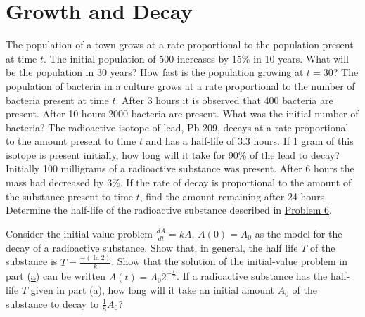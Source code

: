 \documentclass[chapter=3,section=1]{math252homework}
\begin{document}
\section{Growth and Decay}\label{sec:growth-and-decay}
\begin{problems}[start=3]
	\problem The population of a town grows at a rate proportional to the population present at time $t$. The initial population of 500 increases by 15\% in 10 years. What will be the population in 30 years? How fast is the population growing at $t=30$?
	\problem The population of bacteria in a culture grows at a rate proportional to the number of bacteria present at time $t$. After 3 hours it is observed that 400 bacteria are present. After 10 hours 2000 bacteria are present. What was the initial number of bacteria?
	\problem The radioactive isotope of lead, Pb-209, decays at a rate proportional to the amount present to time $t$ and has a half-life of 3.3 hours. If 1 gram of this isotope is present initially, how long will it take for 90\% of the lead to decay?
	\problem Initially 100 milligrams of a radioactive substance was present. After 6 hours the mass had decreased by 3\%. If the rate of decay is proportional to the amount of the substance present to time $t$, find the amount remaining after 24 hours.
	\problem Determine the half-life of the radioactive substance described in \hyperref[prb:6]{Problem 6}.
	\problem\begin{problems}
	    \subproblem Consider the initial-value problem $\frac{dA}{dt}=kA$, $A(0)=A_{0}$ as the model for the decay of a radioactive substance. Show that, in general, the half life $T$ of the substance is $T=\frac{-(\ln2)}{k}$.
		\subproblem Show that the solution of the initial-value problem in part (\hyperref[prb:8a]{a}) can be written $A(t) = A_{0}2^{-\frac{t}{T}}$.
		\subproblem If a radioactive substance has the half-life $T$ given in part (\hyperref[prb:8a]{a}), how long will it take an initial amount $A_{0}$ of the substance to decay to $\frac{1}{8}A_{0}$?
	\end{problems}
\end{problems}
\end{document}
